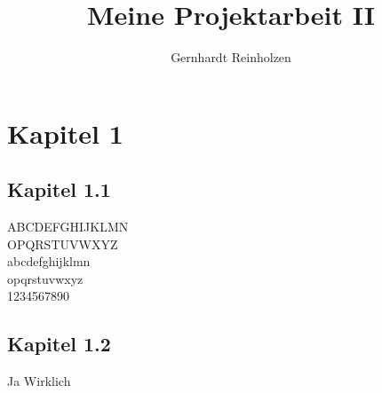 
\title{Meine Projektarbeit II}
\author{Gernhardt Reinholzen}




%



\tableofcontents

 \clearpage 


\section{Kapitel 1}

\subsection{Kapitel 1.1}

ABCDEFGHIJKLMN\\OPQRSTUVWXYZ\\
abcdefghijklmn\\opqrstuvwxyz\\
1234567890

\subsection{Kapitel 1.2}
Ja Wirklich



